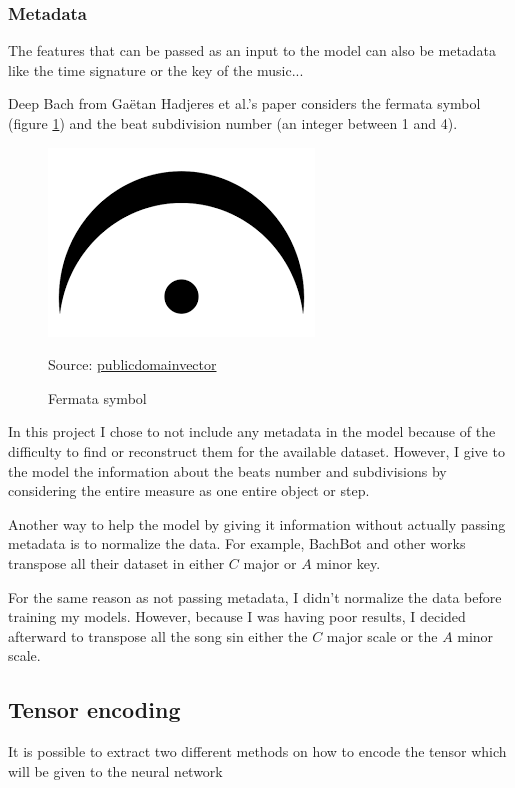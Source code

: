 \documentclass[12pt]{report}
\begin{document}
\subsubsection{Metadata}

The features that can be passed as an input to the model can also be metadata like the time signature or the key of the music...

Deep Bach from Gaëtan Hadjeres et al.'s paper \cite{hadjeres_deepbach:_2016} considers the fermata symbol (figure \ref{fig:fermata}) and the beat subdivision number (an integer between 1 and 4).

\begin{figure}[htbp]
     \centering
     \includegraphics[width=.1\linewidth]{images/music/symbols/fermata.png}
     \caption{Fermata symbol}
     Source: \href{https://publicdomainvectors.org/en/free-clipart/Music-symbol/70183.html}{publicdomainvector}
     \label{fig:fermata}
\end{figure}

In this project I chose to not include any metadata in the model because of the difficulty to find or reconstruct them for the available dataset.
However, I give to the model the information about the beats number and subdivisions by considering the entire measure as one entire object or step.

\bigskip

Another way to help the model by giving it information without actually passing metadata is to normalize the data.
For example, BachBot \cite{liang_automatic_2017} and other works \cite{chuan_modeling_nodate, boulanger-lewandowski_modeling_2012} transpose all their dataset in either $C$ major or $A$ minor key.

For the same reason as not passing metadata, I didn't normalize the data before training my models.
However, because I was having poor results, I decided afterward to transpose all the song sin either the $C$ major scale or the $A$ minor scale.

\subsection{Tensor encoding}

It is possible to extract two different methods on how to encode the tensor which will be given to the neural network
\end{document}
